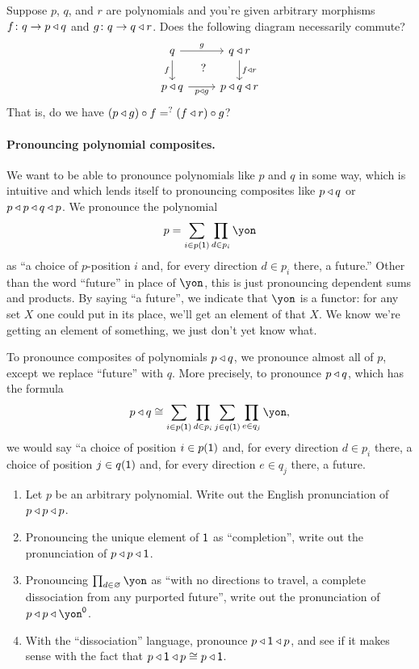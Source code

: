 \documentclass[DynamicalBook]{subfiles}
\begin{document}
\begin{exercise}
Suppose $p$, $q$, and $r$ are polynomials and you're given arbitrary morphisms $f\colon q\to p\mathbin{\triangleleft} q$ and $g\colon q\to q\mathbin{\triangleleft} r$. Does the following diagram necessarily commute?
\[
\begin{tikzcd}
	q\ar[r, "g"]\ar[d, "f"']&
	q\tri r\ar[d, "f\tri r"]\\
	p\tri q\ar[r, "p\tri g"']&
	p\tri q\tri r\ar[ul, phantom, "?"]
\end{tikzcd}
\]
That is, do we have $(p\mathbin{\triangleleft} g)\circ f=^?(f\mathbin{\triangleleft} r)\circ g$?
\end{exercise}

\paragraph{Pronouncing polynomial composites.}

We want to be able to pronounce polynomials like $p$ and $q$ in some way, which is intuitive and which lends itself to pronouncing composites like $p\mathbin{\triangleleft} q$ or $p\mathbin{\triangleleft} p\mathbin{\triangleleft} q\mathbin{\triangleleft} p$. We pronounce the polynomial
\[p=\sum_{i\in p(\1)}\prod_{d\in p_i}\yon\]
as ``a choice of $p$-position $i$ and, for every direction $d\in p_i$ there, a future.'' Other than the word ``future'' in place of $\yon$, this is just pronouncing dependent sums and products. By saying ``a future'', we indicate that $\yon$ is a functor: for any set $X$ one could put in its place, we'll get an element of that $X$. We know we're getting an element of something, we just don't yet know what.

To pronounce composites of polynomials $p\mathbin{\triangleleft} q$, we pronounce almost all of $p$, except we replace ``future'' with $q$. More precisely, to pronounce $p\mathbin{\triangleleft} q$, which has the formula
\[p\tri q\cong\sum_{i\in p(\1)}\prod_{d\in p_i}\sum_{j\in q(\1)}\prod_{e\in q_j}\yon,
\]
we would say ``a choice of position $i\in p(\textsf{1})$ and, for every direction $d\in p_i$ there, a choice of position $j\in q(\textsf{1})$ and, for every direction $e\in q_j$ there, a future.

\begin{exercise}
\begin{enumerate}
	\item Let $p$ be an arbitrary polynomial. Write out the English pronunciation of $p\mathbin{\triangleleft} p\mathbin{\triangleleft} p$.
	\item Pronouncing the unique element of $\textsf{1}$ as ``completion'', write out the pronunciation of $p\mathbin{\triangleleft} p\mathbin{\triangleleft} \textsf{1}$.
	\item Pronouncing $\prod_{d\in\varnothing}\yon$ as ``with no directions to travel, a complete dissociation from any purported future'', write out the pronunciation of $p\tri p\tri\yon^\0$.
	\item With the ``dissociation'' language, pronounce $p\mathbin{\triangleleft}\textsf{1}\mathbin{\triangleleft} p$, and see if it makes sense with the fact that $p\mathbin{\triangleleft}\textsf{1}\mathbin{\triangleleft} p\cong p\mathbin{\triangleleft} \textsf{1}$.
\qedhere
\end{enumerate}
\end{exercise}
\end{document}
